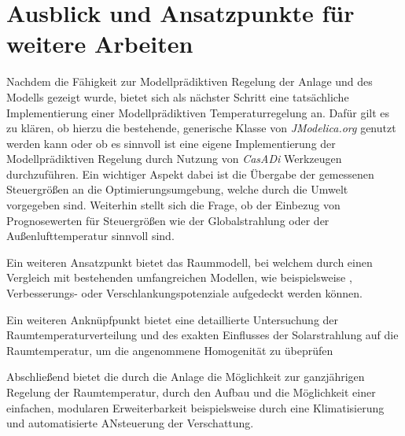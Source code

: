 \section{Ausblick und Ansatzpunkte für weitere Arbeiten}
\label{sec:ausblick}

Nachdem die Fähigkeit zur Modellprädiktiven Regelung der Anlage und des Modells gezeigt wurde, bietet sich als nächster Schritt eine tatsächliche Implementierung einer Modellprädiktiven Temperaturregelung an. Dafür gilt es zu klären, ob hierzu die bestehende, generische Klasse von \textit{JModelica.org} genutzt werden kann oder ob es sinnvoll ist eine eigene Implementierung der Modellprädiktiven Regelung durch Nutzung von \textit{CasADi} Werkzeugen durchzuführen. Ein wichtiger Aspekt dabei ist die Übergabe der gemessenen Steuergrößen an die Optimierungsumgebung, welche durch die Umwelt vorgegeben sind. Weiterhin stellt sich die Frage, ob der Einbezug von Prognosewerten für Steuergrößen wie der Globalstrahlung oder der Außenlufttemperatur sinnvoll sind. 

Ein weiteren Ansatzpunkt bietet das Raummodell, bei welchem durch einen Vergleich mit bestehenden umfangreichen Modellen, wie beispielsweise \cite{therakles13}, Verbesserungs- oder Verschlankungspotenziale aufgedeckt werden können.

Ein weiteren Anknüpfpunkt bietet eine detaillierte Untersuchung der Raumtemperaturverteilung und des exakten Einflusses der Solarstrahlung auf die Raumtemperatur, um die angenommene Homogenität zu übeprüfen

Abschließend bietet die durch die Anlage die Möglichkeit zur ganzjährigen Regelung der Raumtemperatur, durch den Aufbau und die Möglichkeit einer einfachen, modularen Erweiterbarkeit beispielsweise durch eine Klimatisierung und automatisierte ANsteuerung der Verschattung.